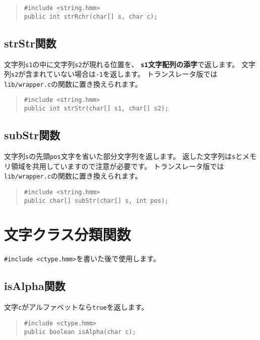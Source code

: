 \begin{quote}
\begin{verbatim}
#include <string.hmm>
public int strRchr(char[] s, char c);
\end{verbatim}
\end{quote}

\subsection{strStr関数}

文字列\verb/s1/の中に文字列\verb/s2/が現れる位置を、
{\bf\verb/s1/文字配列の添字}で返します。
文字列\verb/s2/が含まれていない場合は\verb/-1/を返します。
トランスレータ版では\verb;lib/wrapper.c;の関数に置き換えられます。

\begin{quote}
\begin{verbatim}
#include <string.hmm>
public int strStr(char[] s1, char[] s2);
\end{verbatim}
\end{quote}

\subsection{subStr関数}

文字列\verb/s/の先頭\verb/pos/文字を省いた部分文字列を返します。
返した文字列は\verb/s/とメモリ領域を共用していますので注意が必要です。
トランスレータ版では\verb;lib/wrapper.c;の関数に置き換えられます。

\begin{quote}
\begin{verbatim}
#include <string.hmm>
public char[] subStr(char[] s, int pos);
\end{verbatim}
\end{quote}

\section{文字クラス分類関数}

\verb/#include <ctype.hmm>/を書いた後で使用します。

\subsection{isAlpha関数}

文字\verb/c/がアルファベットなら\verb/true/を返します。

\begin{quote}
\begin{verbatim}
#include <ctype.hmm>
public boolean isAlpha(char c);
\end{verbatim}
\end{quote}

